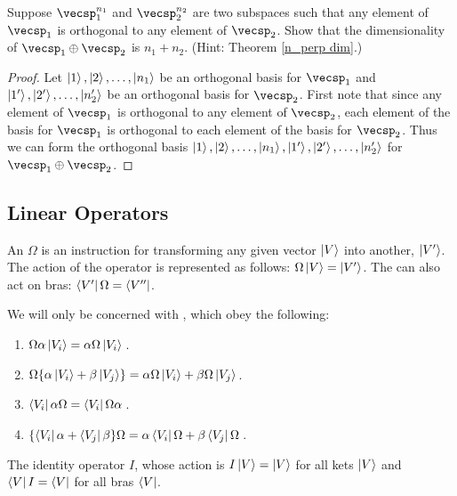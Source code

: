 \begin{exercise}
Suppose $\vecsp_1^{n_1}$ and $\vecsp_2^{n_2}$ are two subspaces such that any element of $\vecsp_1$ is orthogonal to any element of $\vecsp_2$. Show that the dimensionality of $\vecsp_1 \oplus \vecsp_2$ is $n_1 + n_2$. (Hint: Theorem \eqref{n_perp dim}.)
\end{exercise}

\begin{proof}
Let $\ket{1}, \ket{2}, \ldots, \ket{n_1}$ be an orthogonal basis for $\vecsp_1$ and $\ket{1'}, \ket{2'}, \ldots, \ket{n_2'}$ be an orthogonal basis for $\vecsp_2$. First note that since any element of $\vecsp_1$ is orthogonal to any element of $\vecsp_2$, each element of the basis for $\vecsp_1$ is orthogonal to each element of the basis for $\vecsp_2$. Thus we can form the orthogonal basis $\ket{1}, \ket{2}, \ldots, \ket{n_1}, \ket{1'}, \ket{2'}, \ldots, \ket{n_2'}$ for $\vecsp_1 \oplus \vecsp_2$.
\end{proof}


\subsection{Linear Operators}

An  $\Omega$ is an instruction for transforming any given vector $\ket{V}$ into another, $\ket{V'}$. The action of the operator is represented as follows: $\Omega\ket{V} = \ket{V'}$. The can also act on bras: $\bra{V'}\Omega = \bra{V''}$.
\begin{shaded*}
We will only be concerned with , which obey the following:
\begin{enumerate}
    \item $\Omega \alpha \ket{V_i} = \alpha\Omega\ket{V_i}\,$.
    \item $\Omega\{\alpha\ket{V_i} + \beta\ket{V_j}\} = \alpha\Omega\ket{V_i} + \beta\Omega\ket{V_j}\,$.
    \item $\bra{V_i}\alpha\Omega = \bra{V_i}\Omega\alpha\,$.
    \item $\{\bra{V_i}\alpha + \bra{V_j}\beta\}\Omega = \alpha\bra{V_i}\Omega + \beta\bra{V_j}\Omega\,$.
\end{enumerate}
\end{shaded*}

\begin{example}
The identity operator $I$, whose action is $I\ket{V} = \ket{V}$ for all kets $\ket{V}$ and $\bra{V}I = \bra{V}$ for all bras $\bra{V}$.
\end{example}

